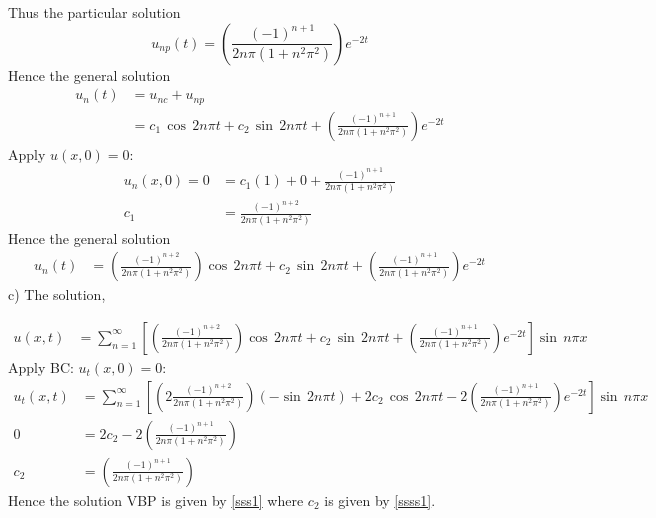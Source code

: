 Thus the particular solution
\begin{equation}
u_{np}(t)=\left(\frac{(-1)^{n+1}}{2n\pi(1+n^2\pi^2)}\right)e^{-2t}
\end{equation}
Hence the general solution
\begin{align*}
u_n(t)&=u_{nc}+u_{np}\\
&=c_1\,\cos\,2n\pi t+c_2\,\sin\,2n\pi t+\left(\frac{(-1)^{n+1}}{2n\pi(1+n^2\pi^2)}\right)e^{-2t}
\end{align*}
Apply $u(x,0)=0$:
\begin{align*}
u_n(x,0)=0&=c_1(1)+0+\frac{(-1)^{n+1}}{2n\pi(1+n^2\pi^2)}\\
c_1&=\frac{(-1)^{n+2}}{2n\pi(1+n^2\pi^2)}
\end{align*}
Hence the general solution
\begin{align}
u_n(t)&=\left(\frac{(-1)^{n+2}}{2n\pi(1+n^2\pi^2)}\right)\cos\,2n\pi t+c_2\,\sin\,2n\pi t+\left(\frac{(-1)^{n+1}}{2n\pi(1+n^2\pi^2)}\right)e^{-2t}
\end{align}
c) 
The solution,

\begin{align}
u(x,t)&=\sum_{n=1}^\infty\left[\left(\frac{(-1)^{n+2}}{2n\pi(1+n^2\pi^2)}\right)\cos\,2n\pi t+c_2\,\sin\,2n\pi t+\left(\frac{(-1)^{n+1}}{2n\pi(1+n^2\pi^2)}\right)e^{-2t}\right]\sin\,n\pi x\label{sss1}
\end{align}
Apply BC: $u_t(x,0)=0$:
\begin{align}
u_t(x,t)&=\sum_{n=1}^\infty\left[\left(2\frac{(-1)^{n+2}}{2n\pi(1+n^2\pi^2)}\right)(-\sin\,2n\pi t)+2c_2\,\cos\,2n\pi t-2\left(\frac{(-1)^{n+1}}{2n\pi(1+n^2\pi^2)}\right)e^{-2t}\right]\sin\,n\pi x\nonumber\\
0&=2c_2-2\left(\frac{(-1)^{n+1}}{2n\pi(1+n^2\pi^2)}\right)\nonumber\\
c_2&=\left(\frac{(-1)^{n+1}}{2n\pi(1+n^2\pi^2)}\right)\label{ssss1}
\end{align}
Hence the solution VBP is given by \eqref{sss1} where $c_2$ is given by \eqref{ssss1}.

